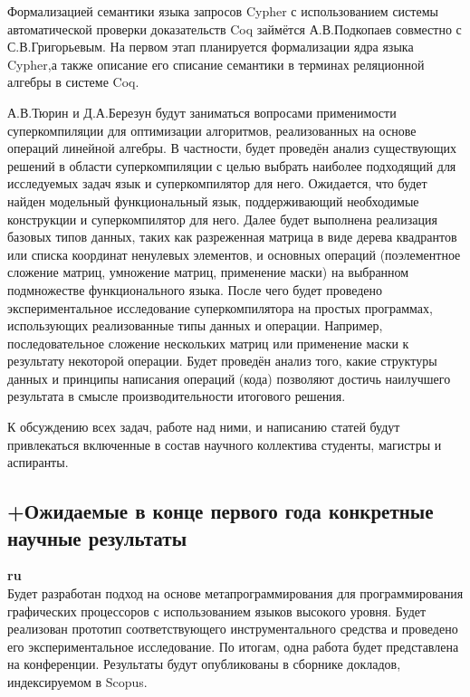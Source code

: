 \documentclass[12pt]{article}  %
\theoremstyle{remark}
\begin{document}
Формализацией семантики языка запросов Cypher с использованием системы автоматической проверки доказательств Coq займётся А.В.Подкопаев совместно с С.В.Григорьевым. На первом этап планируется формализации ядра языка Cypher,а также описание его списание семантики в терминах реляционной алгебры в системе Coq.

А.В.Тюрин и Д.А.Березун будут заниматься вопросами применимости суперкомпиляции для оптимизации алгоритмов, реализованных на основе операций линейной алгебры. В частности, будет проведён анализ существующих решений в области суперкомпиляции с целью выбрать наиболее подходящий для исследуемых задач язык и суперкомпилятор для него. Ожидается, что будет найден модельный функциональный язык, поддерживающий необходимые конструкции и суперкомпилятор для него. Далее будет выполнена реализация базовых типов данных, таких как разреженная матрица в виде дерева квадрантов или списка координат ненулевых элементов, и основных операций (поэлементное сложение матриц, умножение матриц, применение маски) на выбранном подмножестве функционального языка.
После чего будет проведено экспериментальное исследование суперкомпилятора на простых программах, использующих реализованные типы данных и операции. Например, последовательное сложение нескольких матриц или применение маски к результату некоторой операции. Будет проведён анализ того, какие структуры данных и принципы написания операций (кода) позволяют достичь наилучшего результата в смысле производительности итогового решения. 

К обсуждению всех задач, работе над ними, и написанию статей будут привлекаться включенные в состав научного коллектива студенты, магистры и аспиранты.

\subsection{+Ожидаемые в конце первого года конкретные научные результаты}

\textbf{ru}\\

Будет разработан подход на основе метапрограммирования для программирования графических процессоров с использованием языков высокого уровня. Будет реализован прототип соответствующего инструментального средства и проведено его экспериментальное исследование. По итогам, одна работа будет представлена на конференции. Результаты будут опубликованы в сборнике докладов, индексируемом в Scopus.
\end{document}

